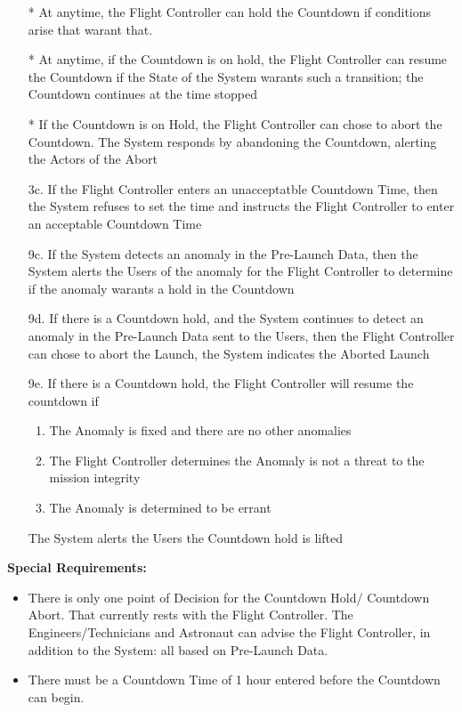 \documentclass[letterpaper]{article}
\begin{document}
\begin{itemize}
\item[*]  At anytime, the Flight Controller can hold the Countdown
if conditions arise that warant that.
\item[*] At anytime, if the Countdown is on hold, the Flight
Controller can resume the Countdown if the State of the System warants
such a transition;  the Countdown continues at the time stopped
\item[*] If the Countdown is on Hold, the Flight Controller can chose
to
abort the Countdown.  The System responds by abandoning the Countdown,
alerting the Actors of the Abort
\item[3c.]If the Flight Controller enters an unacceptatble Countdown
Time, then the System refuses to set the time and instructs the
Flight Controller to enter an acceptable Countdown Time
\item[9c.]  If the System detects an anomaly in the
Pre-Launch Data, then the System alerts the Users of the anomaly for
the Flight Controller to determine if the anomaly warants a hold in
the
Countdown
\item[9d.]  If there is a Countdown hold, and the System continues to
detect an anomaly in the Pre-Launch Data sent to the Users, then the
Flight Controller can chose to abort the Launch, the System indicates
the Aborted Launch
\item[9e.]  If there is a Countdown hold, the Flight Controller will
resume the countdown if
\begin{enumerate}
\item The Anomaly is fixed and there are no other anomalies
\item The Flight Controller determines the Anomaly is not a threat
to the mission integrity
\item The Anomaly is determined to be errant
\end{enumerate}
The System alerts the Users the Countdown hold is lifted
\end{itemize}
\textbf{Special Requirements: }
\begin{itemize}
\item There is only one point of Decision for the Countdown Hold/
Countdown Abort.  That currently rests with the Flight Controller.  The
Engineers/Technicians and Astronaut can advise the Flight Controller,
in addition to the System:  all based on Pre-Launch Data.
\item There must be a Countdown Time of 1 hour entered before the
Countdown can begin.
\end{itemize}
\end{document}
